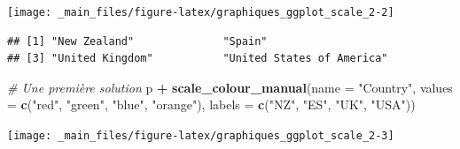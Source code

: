 \documentclass[
  11pt,
]{book}
\newenvironment{Shaded}{\begin{snugshade}}{\end{snugshade}}
\newcommand{\CommentTok}[1]{\textcolor[rgb]{0.56,0.35,0.01}{\textit{#1}}}
\newcommand{\DataTypeTok}[1]{\textcolor[rgb]{0.13,0.29,0.53}{#1}}
\newcommand{\KeywordTok}[1]{\textcolor[rgb]{0.13,0.29,0.53}{\textbf{#1}}}
\newcommand{\NormalTok}[1]{#1}
\newcommand{\OperatorTok}[1]{\textcolor[rgb]{0.81,0.36,0.00}{\textbf{#1}}}
\newcommand{\StringTok}[1]{\textcolor[rgb]{0.31,0.60,0.02}{#1}}
\numberwithin{equation}{section}
\numberwithin{countremarque}{section}
\begin{document}
\begin{center}\texttt{[image: \_main\_files/figure-latex/graphiques\_ggplot\_scale\_2-2]} \end{center}

\begin{Shaded}
\end{Shaded}

\begin{lstlisting}
## [1] "New Zealand"              "Spain"                   
## [3] "United Kingdom"           "United States of America"
\end{lstlisting}

\begin{Shaded}
\begin{Highlighting}[]
\CommentTok{\# Une première solution}
\NormalTok{p }\OperatorTok{+}\StringTok{ }\KeywordTok{scale\_colour\_manual}\NormalTok{(}\DataTypeTok{name =} \StringTok{"Country"}\NormalTok{,}
                        \DataTypeTok{values =} \KeywordTok{c}\NormalTok{(}\StringTok{"red"}\NormalTok{, }\StringTok{"green"}\NormalTok{, }\StringTok{"blue"}\NormalTok{, }\StringTok{"orange"}\NormalTok{),}
                        \DataTypeTok{labels =} \KeywordTok{c}\NormalTok{(}\StringTok{"NZ"}\NormalTok{, }\StringTok{"ES"}\NormalTok{, }\StringTok{"UK"}\NormalTok{, }\StringTok{"USA"}\NormalTok{))}
\end{Highlighting}
\end{Shaded}

\begin{center}\texttt{[image: \_main\_files/figure-latex/graphiques\_ggplot\_scale\_2-3]} \end{center}
\end{document}

